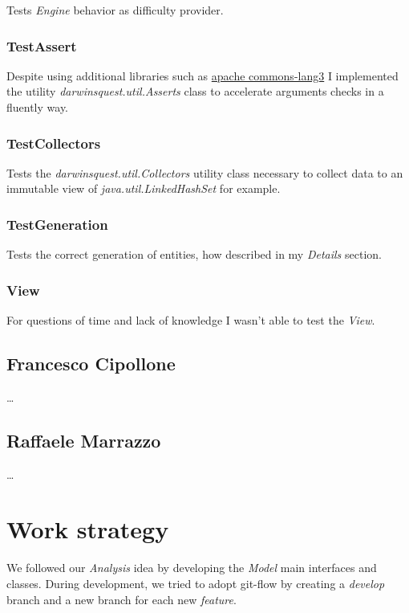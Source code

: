 \documentclass[12pt, a4paper]{report}
\begin{document}
    Tests \emph{Engine} behavior as difficulty provider.

    \subsubsection{TestAssert}
    
    Despite using additional libraries such as \href{https://commons.apache.org/proper/commons-lang/}{apache commons-lang3}
    I implemented the utility \emph{darwinsquest.util.Asserts} class to accelerate arguments checks in a fluently way.

    \subsubsection{TestCollectors}
    
    Tests the \emph{darwinsquest.util.Collectors} utility class necessary to collect data to an immutable view of \emph{java.util.LinkedHashSet} for example.

    \subsubsection{TestGeneration}
    
    Tests the correct generation of entities, how described in my \emph{Details} section.

    \subsubsection{View}

    For questions of time and lack of knowledge I wasn't able to test the \emph{View}.

    \subsection*{Francesco Cipollone}

    \dots

    \subsection*{Raffaele Marrazzo}

    \dots

\section{Work strategy}

    We followed our \emph{Analysis} idea by developing the \emph{Model} main interfaces and classes.
    During development, we tried to adopt git-flow by creating a \emph{develop} branch and a new branch for each new \emph{feature}.
\end{document}
